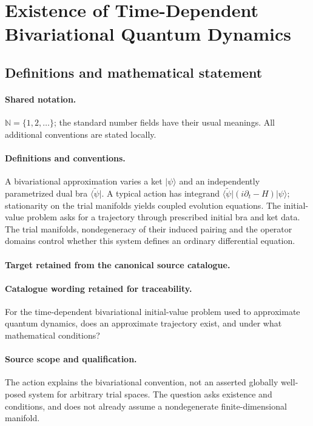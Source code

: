 \documentclass[11pt]{article}
\begin{document}
\section{Existence of Time-Dependent Bivariational Quantum Dynamics}\label{statement}

\subsection{Definitions and mathematical statement}

\paragraph{Shared notation.}$\mathbb N=\{1,2,\ldots\}$; the standard number fields have their usual meanings. All additional conventions are stated locally.


\paragraph{Definitions and conventions.}
A bivariational approximation varies a ket $|\psi\rangle$ and an independently parametrized dual bra $\langle\widetilde\psi|$. A typical action has integrand $\langle\widetilde\psi|(i\partial_t-H)|\psi\rangle$; stationarity on the trial manifolds yields coupled evolution equations. The initial-value problem asks for a trajectory through prescribed initial bra and ket data. The trial manifolds, nondegeneracy of their induced pairing and the operator domains control whether this system defines an ordinary differential equation.

\paragraph{Target retained from the canonical source catalogue.}
\paragraph{Catalogue wording retained for traceability.}
For the time-dependent bivariational initial-value problem used to approximate quantum dynamics, does an approximate trajectory exist, and under what mathematical conditions?

\paragraph{Source scope and qualification.}
The action explains the bivariational convention, not an asserted globally well-posed system for arbitrary trial spaces. The question asks existence and conditions, and does not already assume a nondegenerate finite-dimensional manifold.
\end{document}
